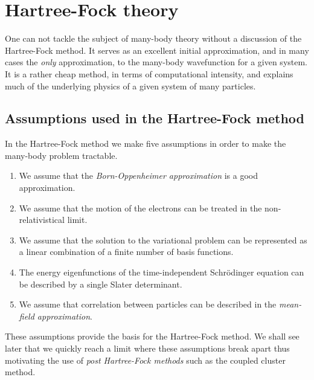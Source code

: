 \chapter{Hartree-Fock theory}
    One can not tackle the subject of many-body theory without a discussion of
    the Hartree-Fock method. It serves as an excellent initial approximation,
    and in many cases the \emph{only} approximation, to the many-body
    wavefunction for a given system. It is a rather cheap method, in terms of
    computational intensity, and explains much of the underlying physics of a
    given system of many particles.

    \section{Assumptions used in the Hartree-Fock method}
        In the Hartree-Fock method we make five assumptions in order to make the
        many-body problem tractable.
        \begin{enumerate}
            \item We assume that the \emph{Born-Oppenheimer approximation} is a
                good approximation.
            \item We assume that the motion of the electrons can be treated in
                the non-relativistical limit.
            \item We assume that the solution to the variational problem can be
                represented as a linear combination of a finite number of basis
                functions.
            \item The energy eigenfunctions of the time-independent Schrödinger
                equation can be described by a single Slater determinant.
            \item We assume that correlation between particles can be described
                in the \emph{mean-field approximation}.
        \end{enumerate}
        These assumptions provide the basis for the Hartree-Fock method. We
        shall see later that we quickly reach a limit where these assumptions
        break apart thus motivating the use of \emph{post Hartree-Fock methods}
        such as the coupled cluster method.

